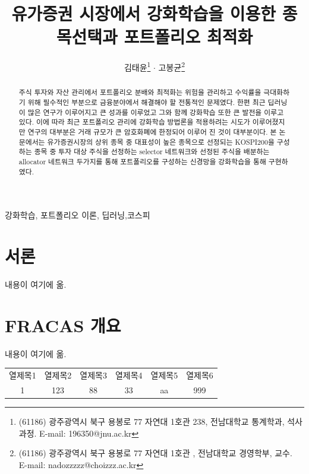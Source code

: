 \documentclass[a4paper]{article}
\begin{document}
\title{유가증권 시장에서 강화학습을 이용한 종목선택과 포트폴리오 최적화}%

\author{
김태윤\footnote{(61186) 광주광역시 북구 용봉로 77 자연대 1호관 238, 전남대학교 통계학과, 석사과정. E-mail: 196350@jnu.ac.kr} $\cdot$
고봉균\footnote{(61186) 광주광역시 북구 용봉로 77 자연대 1호관 , 전남대학교 경영학부, 교수. \\ E-mail: nadozzzzz@choizzz.ac.kr} 
}
\address{
${}^{1}${전남대학교 통계학과} $\cdot$ ${}^{2}${전남대학교 통계학}
}

\accepted
\begin{abstract}
주식 투자와 자산 관리에서 포트폴리오 분배와 최적화는 위험을 관리하고 수익률을 극대화하기 위해 필수적인 부분으로 금융분야에서 해결해야 할 전통적인 문제였다. 한편 최근 딥러닝이 많은 연구가 이루어지고 큰 성과를 이루었고 그와 함께 강화학습 또한 큰 발전을 이루고 있다. 이에 따라 최근 포트폴리오 관리에 강화학습 방법론을 적용하려는 시도가 이루어졌지만 연구의 대부분은 거래 규모가 큰 암호화폐에 한정되어 이루어 진 것이 대부분이다. 본 논문에서는 유가증권시장의 상위 종목 중 대표성이 높은 종목으로 선정되는 KOSPI200을 구성하는 종목 중 투자 대상 주식을 선정하는 selector 네트워크와 선정된 주식을 배분하는 allocator 네트워크 두가지를 통해 포트폴리오를 구성하는 신경망을 강화학습을 통해 구현하였다.
\end{abstract}

\begin{keywords}{강화학습, 포트폴리오 이론, 딥러닝,코스피}
\end{keywords}

\section{서론}
내용이 여기에 옮.

\section{FRACAS 개요}
내용이 여기에 옮.

\begin{table}[!ht]
\label{tbl:data}
\begin{center}
{\scriptsize
{}

\begin{tabular}{cccccc} \hline \hline 
\multicolumn{1}{c}{열제목1} & \multicolumn{1}{c}{열제목2} & \multicolumn{1}{c}{열제목3} & \multicolumn{1}{c}{열제목4} & \multicolumn{1}{c}{열제목5} & \multicolumn{1}{c}{열제목6} \\ \cline{1-6}
\multicolumn{1}{c}{1} & \multicolumn{1}{c}{123} & \multicolumn{1}{c}{88} & \multicolumn{1}{c}{33} & \multicolumn{1}{c}{aa} & \multicolumn{1}{c}{999} \\ 
\hline 
\end{tabular}
}
\end{center}
\end{table}
\end{document}
